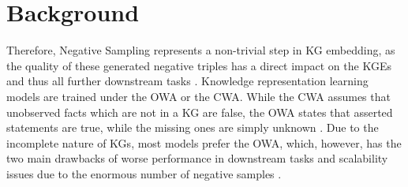 \section{Background}
\label{sec:background}


Therefore, Negative Sampling represents a non-trivial step in \ac{KG} embedding, as the quality of these generated negative triples has a direct impact on the \acp{KGE} and thus all further downstream tasks \cite{qiannegative}.
Knowledge representation learning models are trained under the \ac{OWA} or the \ac{CWA}.
While the \ac{CWA} assumes that unobserved facts which are not in a \ac{KG} are false, the \ac{OWA}  states that asserted statements are true, while the missing ones are simply unknown \cite{arnaout2020enriching, qiannegative}.
Due to the incomplete nature of \acp{KG}, most models prefer the \ac{OWA}, which, however, has the two main drawbacks of worse performance in downstream tasks and scalability issues due to the enormous number of negative samples \cite{qiannegative}.